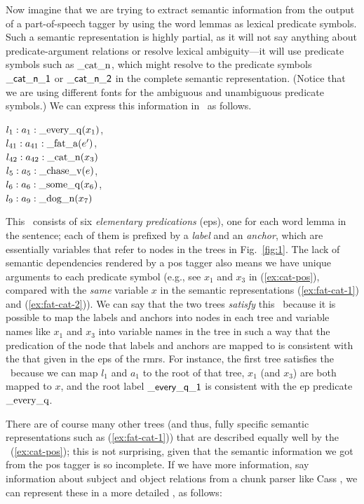 Now imagine that we are trying to extract semantic information from
the output of a part-of-speech tagger by using the word lemmas as
lexical predicate symbols.  Such a semantic representation is highly
partial, as it will not say anything about predicate-argument
relations or resolve lexical ambiguity---it will use predicate
symbols such as $\mathrm{\_cat\_n}$, which might resolve to the
predicate symbols $\mathsf{\_cat\_n\_1}$ or $\mathsf{\_cat\_n\_2}$ in the
complete semantic representation.  (Notice that we are using different
fonts for the ambiguous and unambiguous predicate symbols.)  
We can
express this information in \rmrs\ as follows.

\begin{examples}
\item \label{ex:cat-pos}
$l_1:a_1:\mathrm{\_every\_q}(x_1)$, \\
$l_{41}:a_{41}:\mathrm{\_fat\_a}(e')$,\\
$l_{42}:a_{42}:\mathrm{\_cat\_n}(x_3)$\\
$l_5:a_5:\mathrm{\_chase\_v}(e)$, \\
$l_6:a_6:\mathrm{\_some\_q}(x_6)$, \\
$l_9:a_9:\mathrm{\_dog\_n}(x_7)$
\end{examples}

This \rmrs\ consists of six \emph{elementary predications} ({\sc ep}s), one
for each word lemma in the sentence; each of them is prefixed by a
\emph{label} and an \emph{anchor}, which are essentially variables
that refer to nodes in the trees in Fig.~\ref{fig:1}.  
The lack of semantic dependencies rendered by a {\sc pos} tagger
also means we have unique arguments to each
predicate symbol (e.g., see $x_1$ and $x_3$ in (\ref{ex:cat-pos}),
compared with the {\em same} variable $x$ in the semantic
representations (\ref{ex:fat-cat-1}) and (\ref{ex:fat-cat-2})).
We can say that
the two trees \emph{satisfy} this \rmrs\ because it is possible to map
the labels and anchors into nodes in each tree and variable names like
$x_1$ and $x_3$ into variable names in the tree in such a way that the
predication
of
the node that labels and anchors are mapped to is consistent with the
that given in the {\sc ep}s of the {\sc rmrs}.
For instance, the first tree satisfies
the \rmrs\ because we can map $l_1$ and $a_1$ to the root of that
tree, $x_1$ (and $x_3$) are both mapped to $x$, and the root label
$\mathsf{\_every\_q\_1}$ is consistent with the 
{\sc ep} predicate $\mathrm{\_every\_q}$.

There are of course many other trees (and thus, fully specific
semantic representations such as (\ref{ex:fat-cat-1})) that are
described equally well by the \rmrs\ (\ref{ex:cat-pos}); this is
not surprising, 
given that the semantic information we got from the {\sc pos} tagger is so
incomplete.  If we have more information, say information about
subject and object relations from a chunk parser like Cass
\cite{abney:1996}, we can represent these in a more
detailed \rmrs, as follows:

